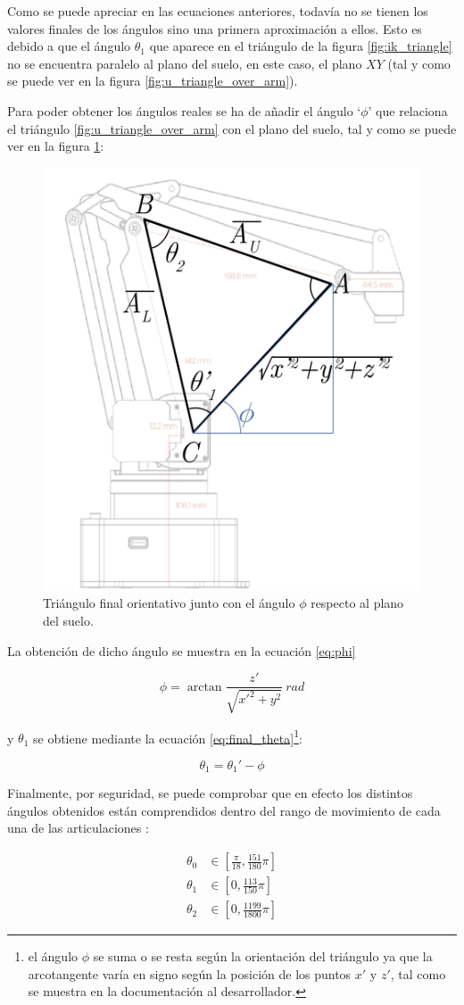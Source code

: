 Como se puede apreciar en las ecuaciones anteriores, todavía no se tienen los valores finales
de los ángulos sino una primera aproximación a ellos. Esto es debido a que el ángulo
$\theta_1$ que aparece en el triángulo de la figura \ref{fig:ik_triangle}
no se encuentra paralelo al plano del suelo, en este caso, el plano $XY$ (tal y como se puede ver
en la figura \ref{fig:u_triangle_over_arm}).

Para poder obtener los ángulos reales se ha de añadir el ángulo `$\phi$' que relaciona el triángulo
\ref{fig:u_triangle_over_arm} con el plano del suelo, tal y como se puede ver en la figura
\ref{fig:final_triangle}:

\begin{figure}[H]
    \centering
    \includegraphics[width=.5\linewidth]{pictures/ik_final.png}
    \caption{Triángulo final orientativo junto con el ángulo $\phi$ respecto al plano del suelo.}
    \label{fig:final_triangle}
\end{figure}

La obtención de dicho ángulo se muestra en la ecuación \ref{eq:phi}

\begin{equation}\label{eq:phi}
    \phi = \arctan{\frac{z'}{\sqrt{x'^2 + y^2}}}~rad
\end{equation}

y $\theta_1$ se obtiene mediante la ecuación
\ref{eq:final_theta}\footnote{el ángulo $\phi$ se suma o se resta según la orientación
    del triángulo ya que la arcotangente varía en signo según la posición de los puntos
    $x'$ y $z'$, tal como se muestra en la documentación al desarrollador\cite{UArmDeveloperSwiftProForArduino}.}:

\begin{equation}\label{eq:final_theta}
    \theta_1 = \theta_1' - \phi
\end{equation}

Finalmente, por seguridad, se puede comprobar que en efecto los distintos ángulos obtenidos
están comprendidos dentro del rango de movimiento de cada una de las articulaciones
\cite{UArmDeveloperSwiftProForArduino}:

\begin{align*}
    \theta_0 & \in \left[\frac{\pi}{18}, \frac{151}{180}\pi\right] \\
    \theta_1 & \in \left[0, \frac{113}{150}\pi\right]              \\
    \theta_2 & \in \left[0, \frac{1199}{1800}\pi\right]
\end{align*}